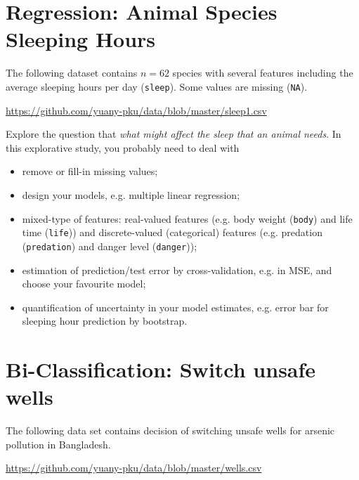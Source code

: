 \documentclass[11pt]{article}
\begin{document}
\section{Regression: Animal Species Sleeping Hours}
The following dataset contains $n=62$ species with several features including the average sleeping hours per day ({\tt sleep}). Some values are missing ({\tt NA}). 

\url{https://github.com/yuany-pku/data/blob/master/sleep1.csv}

Explore the question that \emph{what might affect the sleep that an animal needs}. In this explorative study, you probably need to deal with
\begin{itemize}
\item remove or fill-in missing values;
\item design your models, e.g. multiple linear regression;
\item mixed-type of features: real-valued features (e.g. body weight ({\tt body}) and life time ({\tt life})) and discrete-valued (categorical) features (e.g. predation ({\tt predation}) and danger level ({\tt danger}));
\item estimation of prediction/test error by cross-validation, e.g. in MSE, and choose your favourite model;
\item quantification of uncertainty in your model estimates, e.g. error bar for sleeping hour prediction by bootstrap.
\end{itemize}

%
%

\section{Bi-Classification: Switch unsafe wells}
The following data set contains decision of switching unsafe wells for arsenic pollution in Bangladesh.

\url{https://github.com/yuany-pku/data/blob/master/wells.csv}
\end{document}
